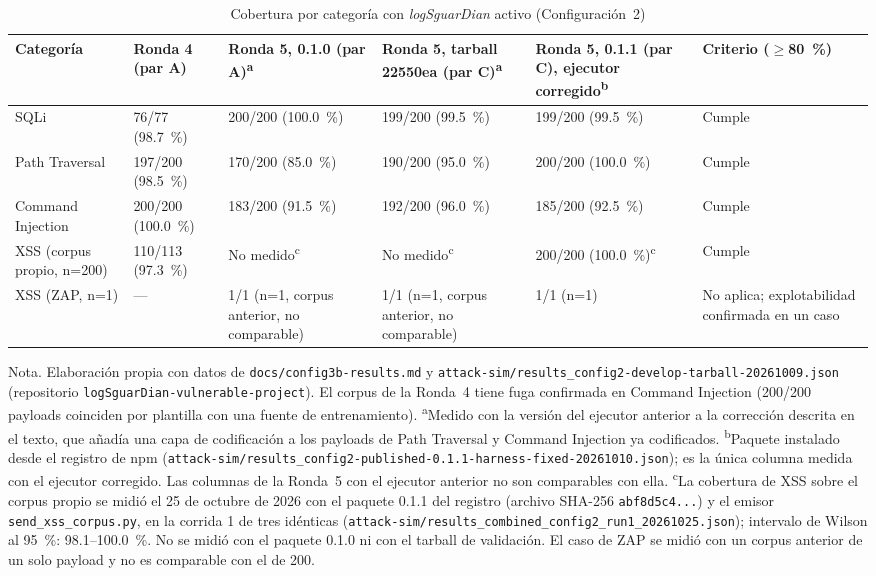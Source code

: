 \begin{table}[H]
\centering
\small
\begin{tabular}{|L{2.2cm}|L{1.9cm}|L{2.0cm}|L{2.0cm}|L{2.2cm}|L{1.9cm}|}
\hline
\textbf{Categoría} & \textbf{Ronda 4 (par A)} & \textbf{Ronda 5, 0.1.0 (par A)\textsuperscript{a}} & \textbf{Ronda 5, tarball 22550ea (par C)\textsuperscript{a}} & \textbf{Ronda 5, 0.1.1 (par C), ejecutor corregido\textsuperscript{b}} & \textbf{Criterio ($\geq$80~\%)} \\ \hline
SQLi & 76/77 (98.7~\%) & 200/200 (100.0~\%) & 199/200 (99.5~\%) & 199/200 (99.5~\%) & Cumple \\ \hline
Path Traversal & 197/200 (98.5~\%) & 170/200 (85.0~\%) & 190/200 (95.0~\%) & 200/200 (100.0~\%) & Cumple \\ \hline
Command Injection & 200/200 (100.0~\%) & 183/200 (91.5~\%) & 192/200 (96.0~\%) & 185/200 (92.5~\%) & Cumple \\ \hline
XSS (corpus propio, n=200) & 110/113 (97.3~\%) & No medido\textsuperscript{c} & No medido\textsuperscript{c} & 200/200 (100.0~\%)\textsuperscript{c} & Cumple \\ \hline
XSS (ZAP, n=1) & --- & 1/1 (n=1, corpus anterior, no comparable) & 1/1 (n=1, corpus anterior, no comparable) & 1/1 (n=1) & No aplica; explotabilidad confirmada en un caso \\ \hline
\end{tabular}
\caption[Cobertura por categoría con logsguardian]{Cobertura por categoría con \textit{logSguarDian} activo (Configuración~2)}
\label{tab:res-cobertura}
\end{table}
{\footnotesize Nota. Elaboración propia con datos de \texttt{docs/config3b-results.md} y
\texttt{attack-sim/results\_config2-develop-tarball-20261009.json} (repositorio
\texttt{logSguarDian-vulnerable-project}). El corpus de la Ronda~4 tiene fuga confirmada en Command Injection (200/200 payloads coinciden por plantilla con
una fuente de entrenamiento). \textsuperscript{a}Medido con la versión del ejecutor anterior a la
corrección descrita en el texto, que añadía una capa de codificación a los payloads de Path
Traversal y Command Injection ya codificados. \textsuperscript{b}Paquete instalado desde el registro de
npm (\texttt{attack-sim/results\_config2-published-0.1.1-harness-fixed-20261010.json}); es la única
columna medida con el ejecutor corregido. Las columnas de la Ronda~5 con el ejecutor anterior no
son comparables con ella. \textsuperscript{c}La cobertura de XSS sobre el corpus propio se midió el
25 de octubre de 2026 con el paquete 0.1.1 del registro (archivo SHA-256 \texttt{abf8d5c4...}) y el
emisor \texttt{send\_xss\_corpus.py}, en la corrida 1 de tres idénticas
(\texttt{attack-sim/results\_combined\_config2\_run1\_20261025.json}); intervalo de Wilson al 95~\%:
98.1--100.0~\%. No se midió con el paquete 0.1.0 ni con el tarball de validación. El caso de ZAP se
midió con un corpus anterior de un solo payload y no es comparable con el de 200.}

